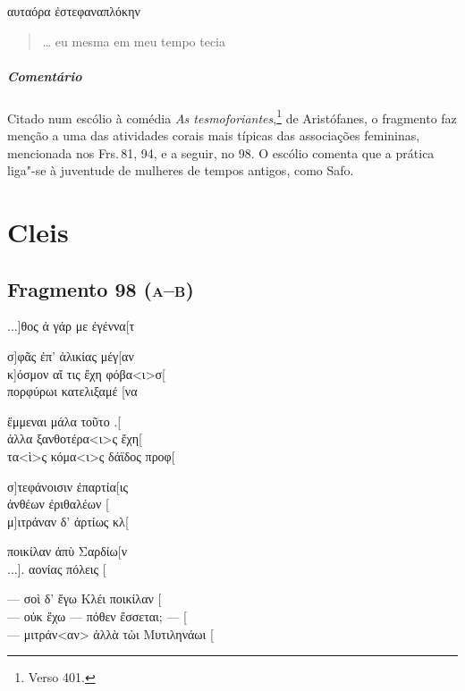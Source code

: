 \begin{gkverse}
\dagger{}αυταόρα\dagger{} ἐστεφαναπλόκην
\end{gkverse}

\begin{verse}
\ldots{} eu mesma em meu tempo tecia 
\end{verse}

\medskip

{\paragraph{Comentário} Citado num escólio à comédia \emph{As tesmoforiantes},\footnote{Verso 401.} de Aristófanes, o fragmento faz menção a uma das atividades corais mais típicas das associações femininas, mencionada nos Frs.\,81, 94, e a seguir, no 98. O escólio comenta que a prática liga"-se à juventude de mulheres de tempos antigos, como Safo.}



\chapter{Cleis}

\section{Fragmento 98 (\textsc{a--b})}

\begin{gkverse}
...]θος ἀ γάρ με ἐγέννα[τ

σ]φᾶς ἐπ’ ἀλικίας μέγ[αν\\
κ]όσμον αἴ τις ἔχη φόβα<ι>σ[\\
πορφύρωι κατελιξαμέ [να

ἔμμεναι μάλα τοῦτο .[\\
ἀλλα ξανθοτέρα<ι>ς ἔχη[\\
τα<ὶ>ς κόμα<ι>ς δάϊδος προφ[

σ]τεφάνοισιν ἐπαρτία[ις\\
ἀνθέων ἐριθαλέων [ \\
μ]ιτράναν δ’ ἀρτίως κλ[

ποικίλαν ἀπὺ Σαρδίω[ν\\
...]. αονίας πόλ{ε}ις [\\

\medskip 

\hspace*{16mm}{\minion [...]}

--- σοὶ δ’ ἔγω Κλέι ποικίλαν [\\
--- οὐκ ἔχω --- πόθεν ἔσσεται; --- [\\
--- μιτράν<αν> ἀλλὰ τὼι Μυτιληνάωι [
\end{gkverse}


